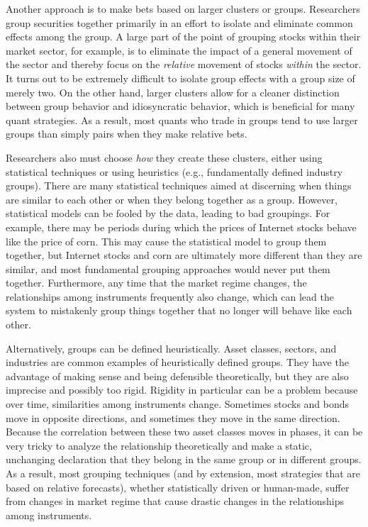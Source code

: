 \documentclass[11pt]{report}
\begin{document}
				Another approach is to make bets based on larger clusters or groups. Researchers group securities together primarily in an effort to isolate and eliminate common effects among the group. A large part of the point of grouping stocks within their market sector, for example, is to eliminate the impact of a general movement of the sector and thereby focus on the \textit{relative} movement of stocks \textit{within} the sector. It turns out to be extremely difficult to isolate group effects with a group size of merely two. On the other hand, larger clusters allow for a cleaner distinction between group behavior and idiosyncratic behavior, which is beneficial for many quant strategies. As a result, most quants who trade in groups tend to use larger groups than simply pairs when they make relative bets.

				Researchers also must choose \textit{how} they create these clusters, either using statistical techniques or using heuristics (e.g., fundamentally defined industry groups). There are many statistical techniques aimed at discerning when things are similar to each other or when they belong together as a group. However, statistical models can be fooled by the data, leading to bad groupings. For example, there may be periods during which the prices of Internet stocks behave like the price of corn. This may cause the statistical model to group them together, but Internet stocks and corn are ultimately more different than they are similar, and most fundamental grouping approaches would never put them together. Furthermore, any time that the market regime changes, the relationships among instruments frequently also change, which can lead the system to mistakenly group things together that no longer will behave like each other.

				Alternatively, groups can be defined heuristically. Asset classes, sectors, and industries are common examples of heuristically defined groups. They have the advantage of making sense and being defensible theoretically, but they are also imprecise and possibly too rigid. Rigidity in particular can be a problem because over time, similarities among instruments change. Sometimes stocks and bonds move in opposite directions, and sometimes they move in the same direction. Because the correlation between these two asset classes moves in phases, it can be very tricky to analyze the relationship theoretically and make a static, unchanging declaration that they belong in the same group or in different groups. As a result, most grouping techniques (and by extension, most strategies that are based on relative forecasts), whether statistically driven or human-made, suffer from changes in market regime that cause drastic changes in the relationships among instruments.
\end{document}
